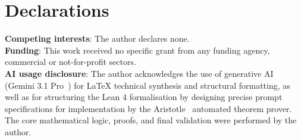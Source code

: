 \documentclass[10pt,twoside]{article}
\theoremstyle{cpctheorem}
\theoremstyle{cpcremark}
\begin{document}
\section*{Declarations}

\textbf{Competing interests}: The author declares none.\\ 
\textbf{Funding}: This work received no specific grant from any funding agency, commercial or
not-for-profit sectors.\\ 
\textbf{AI usage disclosure}: The author acknowledges the use of generative AI (Gemini 3.1
Pro~\cite{geminiteam2025}) for LaTeX technical synthesis and structural formatting, as well as for
structuring the Lean 4 formalisation by designing precise prompt specifications for implementation
by the Aristotle~\cite{Achim2025} automated theorem prover. The core mathematical logic, proofs,
and final validation were performed by the author.\\ 



\end{document}
